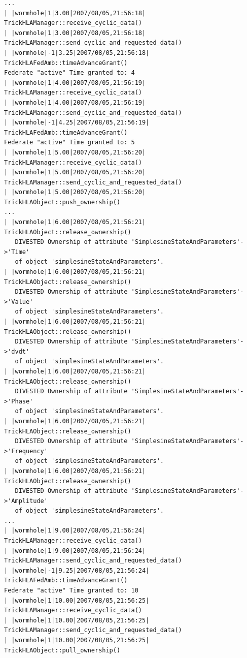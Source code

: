 \begin{lstlisting}[numbers=none,caption={Output stream from the active ownerhsip transfer simulation}]
...
| |wormhole|1|3.00|2007/08/05,21:56:18| TrickHLAManager::receive_cyclic_data()
| |wormhole|1|3.00|2007/08/05,21:56:18| TrickHLAManager::send_cyclic_and_requested_data()
| |wormhole|-1|3.25|2007/08/05,21:56:18| TrickHLAFedAmb::timeAdvanceGrant()
Federate "active" Time granted to: 4
| |wormhole|1|4.00|2007/08/05,21:56:19| TrickHLAManager::receive_cyclic_data()
| |wormhole|1|4.00|2007/08/05,21:56:19| TrickHLAManager::send_cyclic_and_requested_data()
| |wormhole|-1|4.25|2007/08/05,21:56:19| TrickHLAFedAmb::timeAdvanceGrant()
Federate "active" Time granted to: 5
| |wormhole|1|5.00|2007/08/05,21:56:20| TrickHLAManager::receive_cyclic_data()
| |wormhole|1|5.00|2007/08/05,21:56:20| TrickHLAManager::send_cyclic_and_requested_data()
| |wormhole|1|5.00|2007/08/05,21:56:20| TrickHLAObject::push_ownership()
...
| |wormhole|1|6.00|2007/08/05,21:56:21| TrickHLAObject::release_ownership()
   DIVESTED Ownership of attribute 'SimplesineStateAndParameters'->'Time'
   of object 'simplesineStateAndParameters'.
| |wormhole|1|6.00|2007/08/05,21:56:21| TrickHLAObject::release_ownership()
   DIVESTED Ownership of attribute 'SimplesineStateAndParameters'->'Value'
   of object 'simplesineStateAndParameters'.
| |wormhole|1|6.00|2007/08/05,21:56:21| TrickHLAObject::release_ownership()
   DIVESTED Ownership of attribute 'SimplesineStateAndParameters'->'dvdt'
   of object 'simplesineStateAndParameters'.
| |wormhole|1|6.00|2007/08/05,21:56:21| TrickHLAObject::release_ownership()
   DIVESTED Ownership of attribute 'SimplesineStateAndParameters'->'Phase'
   of object 'simplesineStateAndParameters'.
| |wormhole|1|6.00|2007/08/05,21:56:21| TrickHLAObject::release_ownership()
   DIVESTED Ownership of attribute 'SimplesineStateAndParameters'->'Frequency'
   of object 'simplesineStateAndParameters'.
| |wormhole|1|6.00|2007/08/05,21:56:21| TrickHLAObject::release_ownership()
   DIVESTED Ownership of attribute 'SimplesineStateAndParameters'->'Amplitude'
   of object 'simplesineStateAndParameters'.
...
| |wormhole|1|9.00|2007/08/05,21:56:24| TrickHLAManager::receive_cyclic_data()
| |wormhole|1|9.00|2007/08/05,21:56:24| TrickHLAManager::send_cyclic_and_requested_data()
| |wormhole|-1|9.25|2007/08/05,21:56:24| TrickHLAFedAmb::timeAdvanceGrant()
Federate "active" Time granted to: 10
| |wormhole|1|10.00|2007/08/05,21:56:25| TrickHLAManager::receive_cyclic_data()
| |wormhole|1|10.00|2007/08/05,21:56:25| TrickHLAManager::send_cyclic_and_requested_data()
| |wormhole|1|10.00|2007/08/05,21:56:25| TrickHLAObject::pull_ownership()

\end{lstlisting}
